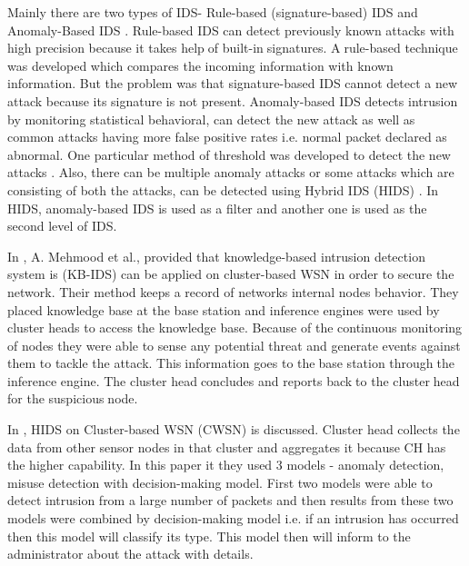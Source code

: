\noindent
Mainly there are two types of IDS- Rule-based (signature-based) IDS and Anomaly-Based IDS \cite{khan2010framework}. Rule-based IDS can detect previously known attacks with high precision because it takes help\textcolor{white}{.}of built-in\textcolor{white}{.}signatures. A\textcolor{white}{.}rule-based technique was developed \cite{jha2002building} which compares the incoming information with known information. But the problem was that signature-based IDS cannot detect a new attack because its signature is not present. Anomaly-based IDS detects intrusion by monitoring statistical behavioral, can detect the new attack as well as common attacks having more false positive rates i.e. normal packet declared as abnormal. One particular method of threshold was developed to detect the new attacks \cite{xie2011anomaly}. Also, there can be multiple anomaly attacks or some attacks which are consisting of both the attacks, can be detected using Hybrid IDS (HIDS) \cite{sedjelmaci2011novel}. In HIDS, anomaly-based IDS is used as a filter and another one is used as the second level of IDS.
\par
In \cite{mehmood2018secure}, A. Mehmood et al., provided that knowledge-based intrusion detection system is (KB-IDS) can be applied on cluster-based WSN in order to secure the network. Their method keeps a record of networks internal nodes behavior. They placed knowledge base at the base station and inference engines were used by cluster heads to access the knowledge base. Because of the continuous monitoring of nodes they were able to sense any potential threat and generate events against them to tackle the attack. This\textcolor{white}{.}information goes to the\textcolor{white}{.}base station through\textcolor{white}{.}the inference engine. The cluster head\textcolor{white}{.}concludes and reports back\textcolor{white}{.}to the cluster\textcolor{white}{.}head for the suspicious\textcolor{white}{.}node.
\par
In \cite{yan2009hybrid}, HIDS on Cluster-based WSN (CWSN) is discussed. Cluster head collects the data from other sensor nodes in that cluster and aggregates it because CH has the higher capability. In this paper it they used 3 models - anomaly detection, misuse detection with decision-making model. First two models were able to detect intrusion from a large number of packets and then results from these two models were combined by decision-making model i.e. if an intrusion has occurred then this model will classify its type. This model then will inform to the administrator about the attack with details.
